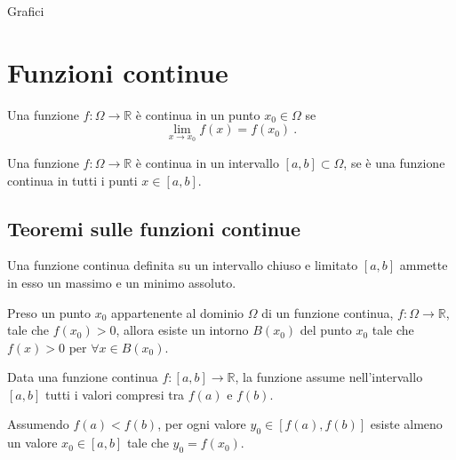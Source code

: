 {\color{red}Grafici}

\section{Funzioni continue}
\begin{definition} Una funzione $f: \Omega \rightarrow \mathbb{R}$ è continua in un punto $x_0 \in \Omega$ se 
    \begin{equation}
        \lim_{x \rightarrow x_0}f(x) = f(x_0) \ .
    \end{equation}
\end{definition}
\begin{definition} Una funzione $f: \Omega \rightarrow \mathbb{R}$ è continua in un intervallo $[a, b] \subset \Omega$, se è una funzione continua in tutti i punti $x \in [a, b]$.
\end{definition}

\subsection{Teoremi sulle funzioni continue}
\begin{theorem}\label{thm:weierstrass} Una funzione continua definita su un intervallo chiuso e limitato $[a, b]$ ammette in esso un massimo e un minimo assoluto.
\end{theorem}

\begin{theorem}\label{thm:sign} Preso un punto $x_0$ appartenente al dominio $\Omega$ di un funzione continua, $f: \Omega \rightarrow \mathbb{R}$, tale che $f(x_0)>0$, allora esiste un intorno $B(x_0)$ del punto $x_0$ tale che $f(x) > 0$ per $\forall x \in B(x_0)$.
\end{theorem}

\begin{theorem}\label{thm:intermediate-values} Data una funzione continua $f: [a,b] \rightarrow \mathbb{R}$, la funzione assume nell'intervallo $[a,b]$ tutti i valori compresi tra $f(a)$ e $f(b)$.

    \noindent
    Assumendo $f(a) < f(b)$, per ogni valore $y_0 \in [f(a), f(b)]$ esiste almeno un valore $x_0 \in [a,b]$ tale che $y_0 = f(x_0)$.
\end{theorem}

